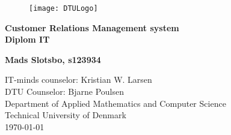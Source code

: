 


  \frontmatter
  \begin{figure}[t!]
    \hspace{8cm}
    \texttt{[image: DTULogo]}
  \end{figure}

  \thispagestyle{empty} %
    \hspace{6cm} \vspace{0cm}
    \begin{center}
    \textbf{
      \Huge {Customer Relations Management system}\\ \vspace{1cm}
      \huge{Diplom IT}
    }
    \end{center}
    \vspace{3cm}
    \begin{center}
    \Large{\textbf{Mads Slotsbo, s123934}}
    \end{center}
    \vspace{4.0cm}
    IT-minds counselor: Kristian W. Larsen\\
    DTU Counselor: Bjarne Poulsen\\
    Department of Applied Mathematics and Computer Science\\
    Technical University of Denmark\\
    \today

  
  \listoftodos

  \tableofcontents
  \listoffigures                      %
	\mainmatter

  

  
  
  
  
  
  

  \appendix
  
  
  

  \backmatter
  \printbibliography

